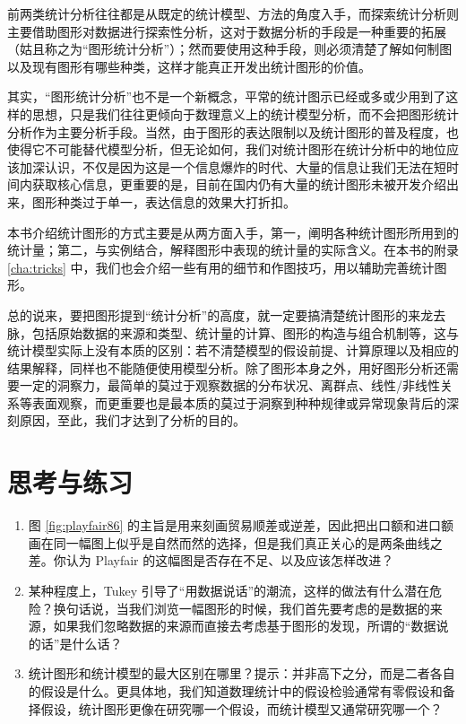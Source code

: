 \documentclass[
  b5paper,
  UTF8,twoside]{book}
\begin{document}
前两类统计分析往往都是从既定的统计模型、方法的角度入手，而探索统计分析则主要借助图形对数据进行探索性分析，这对于数据分析的手段是一种重要的拓展（姑且称之为``图形统计分析''）；然而要使用这种手段，则必须清楚了解如何制图以及现有图形有哪些种类，这样才能真正开发出统计图形的价值。

其实，``图形统计分析''也不是一个新概念，平常的统计图示已经或多或少用到了这样的思想，只是我们往往更倾向于数理意义上的统计模型分析，而不会把图形统计分析作为主要分析手段。当然，由于图形的表达限制以及统计图形的普及程度，也使得它不可能替代模型分析，但无论如何，我们对统计图形在统计分析中的地位应该加深认识，不仅是因为这是一个信息爆炸的时代、大量的信息让我们无法在短时间内获取核心信息，更重要的是，目前在国内仍有大量的统计图形未被开发介绍出来，图形种类过于单一，表达信息的效果大打折扣。

本书介绍统计图形的方式主要是从两方面入手，第一，阐明各种统计图形所用到的统计量；第二，与实例结合，解释图形中表现的统计量的实际含义。在本书的附录 \ref{cha:tricks} 中，我们也会介绍一些有用的细节和作图技巧，用以辅助完善统计图形。

总的说来，要把图形提到``统计分析''的高度，就一定要搞清楚统计图形的来龙去脉，包括原始数据的来源和类型、统计量的计算、图形的构造与组合机制等，这与统计模型实际上没有本质的区别：若不清楚模型的假设前提、计算原理以及相应的结果解释，同样也不能随便使用模型分析。除了图形本身之外，用好图形分析还需要一定的洞察力，最简单的莫过于观察数据的分布状况、离群点、线性/非线性关系等表面观察，而更重要也是最本质的莫过于洞察到种种规律或异常现象背后的深刻原因，至此，我们才达到了分析的目的。

\hypertarget{ux601dux8003ux4e0eux7ec3ux4e60}{%
\section{思考与练习}\label{ux601dux8003ux4e0eux7ec3ux4e60}}

\begin{enumerate}
\def\labelenumi{\arabic{enumi}.}
\item
  图 \ref{fig:playfair86} 的主旨是用来刻画贸易顺差或逆差，因此把出口额和进口额画在同一幅图上似乎是自然而然的选择，但是我们真正关心的是两条曲线之差。你认为 Playfair 的这幅图是否存在不足、以及应该怎样改进？
\item
  某种程度上，Tukey 引导了``用数据说话''的潮流，这样的做法有什么潜在危险？换句话说，当我们浏览一幅图形的时候，我们首先要考虑的是数据的来源，如果我们忽略数据的来源而直接去考虑基于图形的发现，所谓的``数据说的话''是什么话？
\item
  统计图形和统计模型的最大区别在哪里？提示：并非高下之分，而是二者各自的假设是什么。更具体地，我们知道数理统计中的假设检验通常有零假设和备择假设，统计图形更像在研究哪一个假设，而统计模型又通常研究哪一个？
\end{enumerate}
\end{document}
